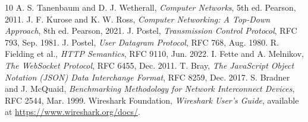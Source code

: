 \documentclass[conference]{IEEEtran}
\begin{document}
\begin{thebibliography}{10}
 A. S. Tanenbaum and D. J. Wetherall, \emph{Computer Networks}, 5th ed. Pearson, 2011.
 J. F. Kurose and K. W. Ross, \emph{Computer Networking: A Top-Down Approach}, 8th ed. Pearson, 2021.
 J. Postel, \emph{Transmission Control Protocol}, RFC 793, Sep. 1981.
 J. Postel, \emph{User Datagram Protocol}, RFC 768, Aug. 1980.
 R. Fielding et al., \emph{HTTP Semantics}, RFC 9110, Jun. 2022.
 I. Fette and A. Melnikov, \emph{The WebSocket Protocol}, RFC 6455, Dec. 2011.
 T. Bray, \emph{The JavaScript Object Notation (JSON) Data Interchange Format}, RFC 8259, Dec. 2017.
 S. Bradner and J. McQuaid, \emph{Benchmarking Methodology for Network Interconnect Devices}, RFC 2544, Mar. 1999.
 Wireshark Foundation, \emph{Wireshark User's Guide}, available at \url{https://www.wireshark.org/docs/}.
\end{thebibliography}
\end{document}
